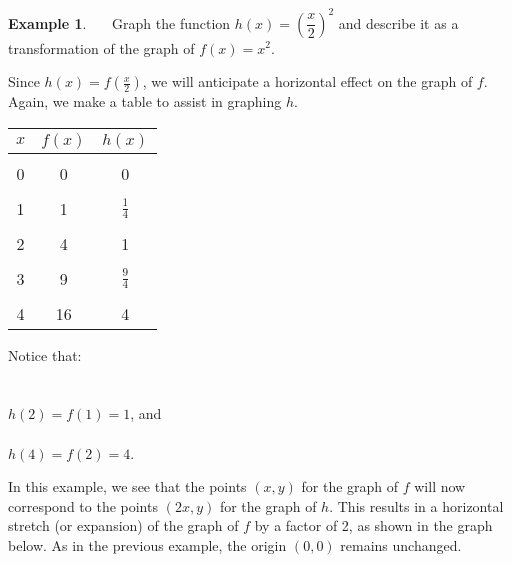 \documentclass[12pt]{book}
\theoremstyle{definition}
\newtheorem{example}{Example}
\begin{document}
\begin{example}~~~Graph the function $h(x)=\left(\dfrac{x}{2}\right)^2$ and describe it as a transformation of the graph of $f(x)=x^2$.\par
Since $h(x)=f\left(\frac{x}{2}\right)$, we will anticipate a horizontal effect on the graph of $f$.  Again, we make a table to assist in graphing $h$. 
\begin{multicols}{2}
\begin{center}
\begin{tabular}{c||c|c}
$x$ & $f(x)$ &  $h(x)$ \\
\hline
&&\\
0 & 0 & 0 \\
&&\\
1 & 1 &  $\frac{1}{4}$ \\
&&\\
2 & 4 &  1 \\
&&\\
3 & 9 &  $\frac{9}{4}$ \\
&&\\
4 & 16 & 4 
\end{tabular}
\end{center}
Notice that:\\
~\\
~\\
$h(2)=f(1)=1$, and\\
~\\
$h(4)=f(2)=4$.
\end{multicols}
In this example, we see that the points $(x,y)$ for the graph of $f$ will now correspond to the points $(2x,y)$ for the graph of $h$.  This results in a horizontal stretch (or expansion) of the graph of $f$ by a factor of 2, as shown in the graph below.  As in the previous example, the origin $(0,0)$ remains unchanged.
\begin{center}
\end{center}
\end{example}
\end{document}
